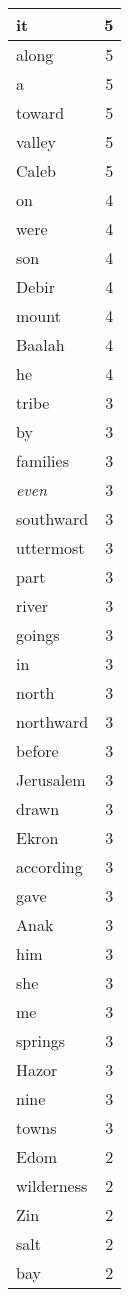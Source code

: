 \begin{center}
\begin{longtable}{l|r}
it & 5\\ \hline 
along & 5\\ \hline 
a & 5\\ \hline 
toward & 5\\ \hline 
valley & 5\\ \hline 
Caleb & 5\\ \hline 
on & 4\\ \hline 
were & 4\\ \hline 
son & 4\\ \hline 
Debir & 4\\ \hline 
mount & 4\\ \hline 
Baalah & 4\\ \hline 
he & 4\\ \hline 
tribe & 3\\ \hline 
by & 3\\ \hline 
families & 3\\ \hline 
\emph{even} & 3\\ \hline 
southward & 3\\ \hline 
uttermost & 3\\ \hline 
part & 3\\ \hline 
river & 3\\ \hline 
goings & 3\\ \hline 
in & 3\\ \hline 
north & 3\\ \hline 
northward & 3\\ \hline 
before & 3\\ \hline 
Jerusalem & 3\\ \hline 
drawn & 3\\ \hline 
Ekron & 3\\ \hline 
according & 3\\ \hline 
gave & 3\\ \hline 
Anak & 3\\ \hline 
him & 3\\ \hline 
she & 3\\ \hline 
me & 3\\ \hline 
springs & 3\\ \hline 
Hazor & 3\\ \hline 
nine & 3\\ \hline 
towns & 3\\ \hline 
Edom & 2\\ \hline 
wilderness & 2\\ \hline 
Zin & 2\\ \hline 
salt & 2\\ \hline 
bay & 2\\ \hline 

\end{longtable}
\end{center}
